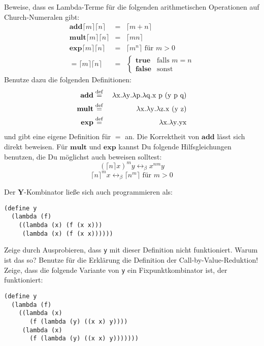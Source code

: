 \begin{aufgabe}\label{ex:church}
  Beweise, dass es Lambda-Terme für die folgenden arithmetischen
  Operationen auf Church-Numeralen gibt:
  \begin{eqnarray*}
    \mathbf{add} \lceil m\rceil \lceil n\rceil &=& \lceil m+n\rceil
    \\
    \mathbf{mult} \lceil m\rceil \lceil n\rceil &=& \lceil mn\rceil
    \\
    \mathbf{exp} \lceil m\rceil \lceil n\rceil &=& \lceil m^n\rceil
    \textrm{ für } m>0\\
    \mathbf{=}\lceil m\rceil \lceil n\rceil &=&
    \begin{cases}
      \mathbf{true} & \text{falls } m = n\\
      \mathbf{false} & \text{sonst}
    \end{cases}
  \end{eqnarray*}
  Benutze dazu die folgenden Definitionen:
  \begin{eqnarray*}
    \mathbf{add} &\stackrel{\rm def}{=}{}& \lambda \mathrm x.\lambda \mathrm y.\lambda \mathrm p.\lambda \mathrm q.\mathrm x~\mathrm p~(\mathrm y~\mathrm p~\mathrm q)\\
    \mathbf{mult} &\stackrel{\rm def}{=}{}& \lambda \mathrm x.\lambda \mathrm y.\lambda \mathrm z.\mathrm x~(\mathrm y~\mathrm z)\\
    \mathbf{exp} &\stackrel{\rm def}{=}{}& \lambda \mathrm x.\lambda \mathrm y.\mathrm y\mathrm x
  \end{eqnarray*}
  und gibt eine eigene Definition für $=$ an.
  Die Korrektheit von $\mathbf{add}$ lässt sich direkt beweisen.
  Für $\mathbf{mult}$ und $\mathbf{exp}$ kannst Du
  folgende Hilfsgleichungen benutzen, die Du möglichst auch beweisen solltest:
  \begin{displaymath}
    (\lceil n\rceil x)^m y \leftrightarrow_{\beta} x^{nm} y
  \end{displaymath}
  \begin{displaymath}
    \label{eq:lem-2}
    \lceil n\rceil^m x \leftrightarrow_{\beta} \lceil n^m\rceil
    \textrm{ für } m>0
  \end{displaymath}
\end{aufgabe}
\begin{aufgabe}
  Der $\mathbf{Y}$-Kombinator ließe sich auch programmieren
  als:
\begin{verbatim}
(define y 
  (lambda (f)
    ((lambda (x) (f (x x)))
     (lambda (x) (f (x x))))))
\end{verbatim}
  Zeige durch Ausprobieren, dass \texttt{y} mit dieser Definition 
  nicht funktioniert.  Warum ist das so?  Benutze für die
  Erklärung die Definition der Call-by-Value-Reduktion!
  Zeige, dass die folgende Variante von \texttt{y} ein
  Fixpunktkombinator ist, der funktioniert:
\begin{verbatim}
(define y
  (lambda (f)
    ((lambda (x)
       (f (lambda (y) ((x x) y))))
     (lambda (x)
       (f (lambda (y) ((x x) y)))))))
\end{verbatim}

\end{aufgabe}
